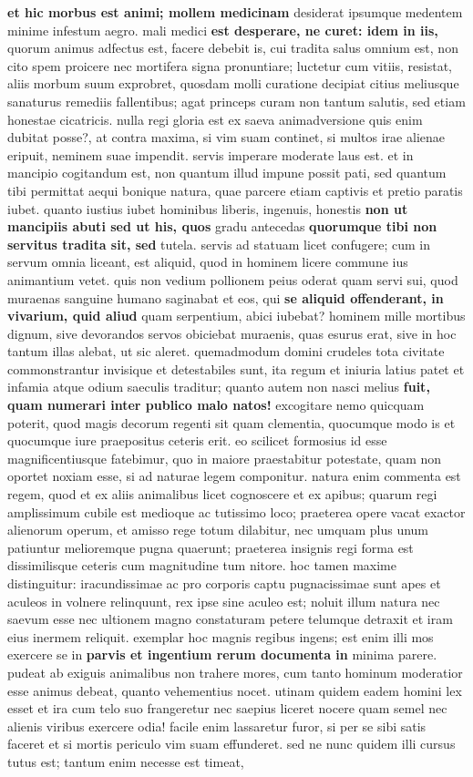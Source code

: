 \textbf{et hic morbus est animi; mollem medicinam} desiderat ipsumque medentem minime infestum aegro. mali medici \textbf{est desperare, ne curet: idem in iis,} quorum animus adfectus est, facere debebit is, cui tradita salus omnium est, non cito spem proicere nec mortifera signa pronuntiare; luctetur cum vitiis, resistat, aliis morbum suum exprobret, quosdam molli curatione decipiat citius meliusque sanaturus remediis fallentibus; agat princeps curam non tantum salutis, sed etiam honestae cicatricis. nulla regi gloria est ex saeva animadversione quis enim dubitat posse?, at contra maxima, si vim suam continet, si multos irae alienae eripuit, neminem suae impendit. servis imperare moderate laus est. et in mancipio cogitandum est, non quantum illud impune possit pati, sed quantum tibi permittat aequi bonique natura, quae parcere etiam captivis et pretio paratis iubet. quanto iustius iubet hominibus liberis, ingenuis, honestis \textbf{non ut mancipiis abuti sed ut his, quos} gradu antecedas \textbf{quorumque tibi non servitus tradita sit, sed} tutela. servis ad statuam licet confugere; cum in servum omnia liceant, est aliquid, quod in hominem licere commune ius animantium vetet. quis non vedium pollionem peius oderat quam servi sui, quod muraenas sanguine humano saginabat et eos, qui \textbf{se aliquid \textbf{offenderant, in vivarium, quid} aliud} quam serpentium, abici iubebat? hominem mille mortibus dignum, sive devorandos servos obiciebat muraenis, quas esurus erat, sive in hoc tantum illas alebat, ut sic aleret. quemadmodum domini crudeles tota civitate commonstrantur invisique et detestabiles sunt, ita regum et iniuria latius patet et infamia atque odium saeculis traditur; quanto autem non nasci melius \textbf{fuit, \textbf{quam numerari inter publico malo} natos!} excogitare nemo quicquam poterit, quod magis decorum regenti sit quam clementia, quocumque modo is et quocumque iure praepositus ceteris erit. eo scilicet formosius id esse magnificentiusque fatebimur, quo in maiore praestabitur potestate, quam non oportet noxiam esse, si ad naturae legem componitur. natura enim commenta est regem, quod et ex aliis animalibus licet cognoscere et ex apibus; quarum regi amplissimum cubile est medioque ac tutissimo loco; praeterea opere vacat exactor alienorum operum, et amisso rege totum dilabitur, nec umquam plus unum patiuntur melioremque pugna quaerunt; praeterea insignis regi forma est dissimilisque ceteris cum magnitudine tum nitore. hoc tamen maxime distinguitur: iracundissimae ac pro corporis captu pugnacissimae sunt apes et aculeos in volnere relinquunt, rex ipse sine aculeo est; noluit illum natura nec saevum esse nec ultionem magno constaturam petere telumque detraxit et iram eius inermem reliquit. exemplar hoc magnis regibus ingens; est enim illi mos exercere se in \textbf{\textbf{parvis et ingentium rerum documenta} in} minima parere. pudeat ab exiguis animalibus non trahere mores, cum tanto hominum moderatior esse animus debeat, quanto vehementius nocet. utinam quidem eadem homini lex esset et ira cum telo suo frangeretur nec saepius liceret nocere quam semel nec alienis viribus exercere odia! facile enim lassaretur furor, si per se sibi satis faceret et si mortis periculo vim suam effunderet. sed ne nunc quidem illi cursus tutus est; tantum enim necesse est timeat, 
